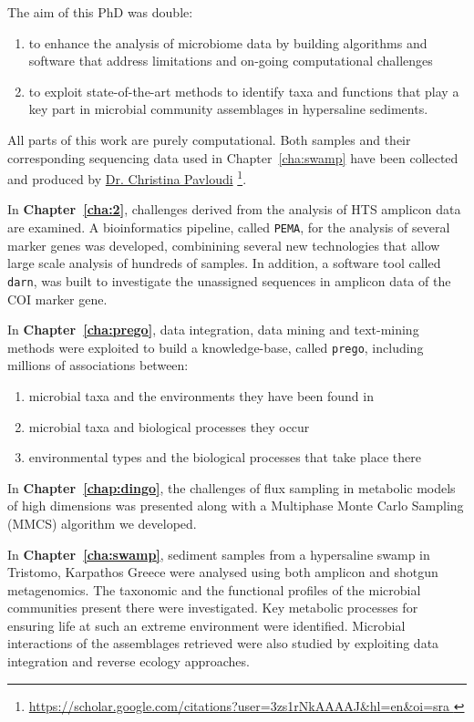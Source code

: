    The aim of this PhD was double:
   \begin{enumerate}
      \item to enhance the analysis of microbiome data 
            by building algorithms and software 
            that address limitations and on-going computational challenges
      \item to exploit state-of-the-art methods to identify taxa and functions  
            that play a key part in microbial community assemblages in hypersaline sediments.
   \end{enumerate}
   All parts of this work are purely computational. 
   Both samples and their corresponding sequencing data used in Chapter~\ref{cha:swamp} have been collected 
   and produced by 
   \href{https://scholar.google.com/citations?user=3zs1rNkAAAAJ&hl=en&oi=sra}{Dr. Christina Pavloudi} \footnote{
      \href{https://scholar.google.com/citations?user=3zs1rNkAAAAJ&hl=en&oi=sra}{
         https://scholar.google.com/citations?user=3zs1rNkAAAAJ\&hl=en\&oi=sra
      }
   }. 

   In \textbf{Chapter~\ref{cha:2}}, challenges derived from the analysis of HTS amplicon data are examined.
   A bioinformatics pipeline, called \texttt{PEMA}, for the analysis of several marker genes was developed, combinining several new technologies that allow large scale analysis of hundreds of samples. 
   In addition, a software tool called \texttt{darn}, was built to investigate the unassigned sequences in amplicon data of the COI marker gene. 

   In \textbf{Chapter~\ref{cha:prego}}, data integration, data mining and text-mining methods were exploited to build a knowledge-base, called \texttt{prego}, including millions of associations between:
   \begin{enumerate}
      \item microbial taxa and the environments they have been found in 
      \item microbial taxa and biological processes they occur
      \item environmental types and the biological processes that take place there
   \end{enumerate}

   In \textbf{Chapter~\ref{chap:dingo}}, the challenges of flux sampling in metabolic models of high dimensions was presented along with a Multiphase Monte Carlo Sampling (MMCS) algorithm we developed. 

   In \textbf{Chapter~\ref{cha:swamp}}, sediment samples from a hypersaline swamp in Tristomo, Karpathos Greece were analysed using both amplicon and shotgun metagenomics. 
   The taxonomic and the functional profiles of the microbial communities present there were investigated. 
   Key metabolic processes for ensuring life at such an extreme environment were identified.
   Microbial interactions of the assemblages retrieved were also studied by exploiting 
   data integration and reverse ecology approaches.  

